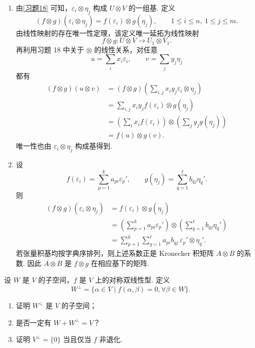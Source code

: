 \begin{solution}
	\begin{enumerate}
		\item {}\label{p1:concept:c7-l2824}由\ref{习题18} 可知，$\varepsilon_i\otimes\eta_j$ 构成 $U\otimes V$ 的一组基. 定义
		\[
		(f\otimes g)(\varepsilon_i\otimes\eta_j)=f(\varepsilon_i)\otimes g(\eta_j),
		\qquad 1\le i\le n,
		\ 1\le j\le m.
		\]
		由线性映射的存在唯一性定理，该定义唯一延拓为线性映射
		\[
		f\otimes g:U\otimes V\to U_1\otimes V_1.
		\]
		再利用习题 18 中关于 $\otimes$ 的线性关系，对任意
		\[
		u=\sum_i x_i\varepsilon_i,
		\qquad
		v=\sum_j y_j\eta_j
		\]
		都有
		\[
		\begin{aligned}
			(f\otimes g)(u\otimes v)
			&=(f\otimes g)\left(\sum_{i,j}x_iy_j\varepsilon_i\otimes\eta_j\right) \\
			&=\sum_{i,j}x_iy_j f(\varepsilon_i)\otimes g(\eta_j) \\
			&=\left(\sum_i x_if(\varepsilon_i)\right)\otimes
			\left(\sum_j y_jg(\eta_j)\right) \\
			&=f(u)\otimes g(v).
		\end{aligned}
		\]
		唯一性也由 $\varepsilon_i\otimes\eta_j$ 构成基得到.
		
		\item 设
		\[
		f(\varepsilon_i)=\sum_{p=1}^k a_{pi}\varepsilon_p',
		\qquad
		g(\eta_j)=\sum_{q=1}^{\ell} b_{qj}\eta_q'.
		\]
		则
		\[
		\begin{aligned}
			(f\otimes g)(\varepsilon_i\otimes\eta_j)
			&=f(\varepsilon_i)\otimes g(\eta_j) \\
			&=\left(\sum_{p=1}^k a_{pi}\varepsilon_p'\right)
			\otimes
			\left(\sum_{q=1}^{\ell} b_{qj}\eta_q'\right) \\
			&=\sum_{p=1}^k\sum_{q=1}^{\ell} a_{pi}b_{qj}\,
			\varepsilon_p'\otimes\eta_q'.
		\end{aligned}
		\]
		若张量积基均按字典序排列，则上述系数正是 Kronecker 积矩阵 $A\otimes B$ 的系数. 因此 $A\otimes B$ 是 $f\otimes g$ 在相应基下的矩阵.
	\end{enumerate}
\end{solution}

\begin{problem}
	\label{p1:concept:c7-l2876}设 $W$ 是 $V$ 的子空间，$f$ 是 $V$ 上的对称双线性型. 定义
	\[
	W^\perp=\{\alpha\in V\mid f(\alpha,\beta)=0,
	\forall \beta\in W\}.
	\]
	\begin{enumerate}
		\item 证明 $W^\perp$ 是 $V$ 的子空间；
		\item 是否一定有 $W+W^\perp=V$？
		\item 证明 $V^\perp=\{0\}$ 当且仅当 $f$ 非退化.
	\end{enumerate}
\end{problem}

